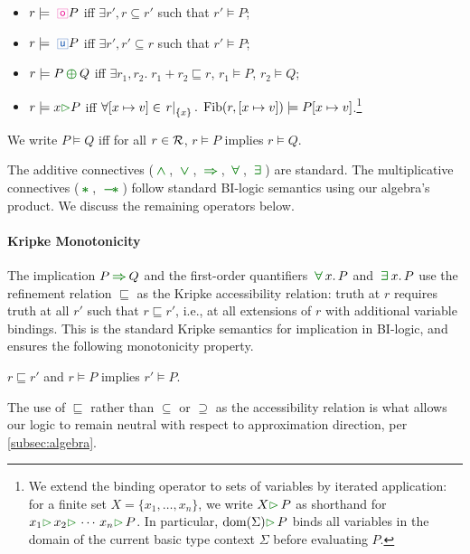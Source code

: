 \begin{definition}
\begin{itemize}
  \item $r \models \demonic P$ iff $\exists r', r \subseteq r'$ such that $r' \models P$;
  \item $r \models \angelic P$ iff $\exists r', r' \subseteq r$ such that $r' \models P$;
  \item $r \models P \choplus Q$ iff $\exists r_1, r_2.\; r_1 + r_2 \sqsubseteq r$,\; $r_1 \models P$,\; $r_2 \models Q$;
  \item $r \models \forallM{x} P$ iff $\forall [x \mapsto v] \in \left.{r}\right|_{\{x\}}.\; \operatorname{Fib}(r,[x \mapsto v]) \models P[x \mapsto v]$.\footnote{
We extend the binding operator to sets of variables by iterated
application: for a finite set $X = \{x_1, \ldots, x_n\}$,
we write $\forallM{X}\, P$ as shorthand
for
$\forallM{x_1}\,\forallM{x_2}\,\cdots\,\forallM{x_n}\,P$.
In particular,
$\forallM{\Dom{\Sigma}}\, P$ binds all
variables in the domain of the current basic type context $\Sigma$
before evaluating $P$.}
  \end{itemize}
  We write $P \models Q$ iff for all $r \in \mathcal{R}$, $r \models P$ implies $r \models Q$.
\end{definition}

The additive connectives ($\chland$, $\chlor$, $\chimpl$, $\chforall$,
$\chexists$) are standard.  The multiplicative connectives ($\chstar$,
$\chwand$) follow standard BI-logic semantics using our algebra's
product.  We discuss the remaining operators below.

\paragraph{Kripke Monotonicity}
The implication $P \chimpl Q$ and the first-order quantifiers
$\chforall x.\, P$ and $\chexists x.\, P$ use the refinement relation
$\sqsubseteq$ as the Kripke accessibility relation: truth at $r$
requires truth at all $r'$ such that $r \sqsubseteq r'$, i.e., at all
extensions of $r$ with additional variable bindings.  This is the
standard Kripke semantics for implication in BI-logic, and ensures the
following monotonicity property.

\begin{theorem}\label{thm:kripke-monotonicity}
  $r \sqsubseteq r'$ and $r \models P$ implies $r' \models P$.
\end{theorem}

The use of $\sqsubseteq$ rather than $\subseteq$ or $\supseteq$ as the
accessibility relation is what allows our logic to remain neutral with
respect to approximation direction, per \autoref{subsec:algebra}.


